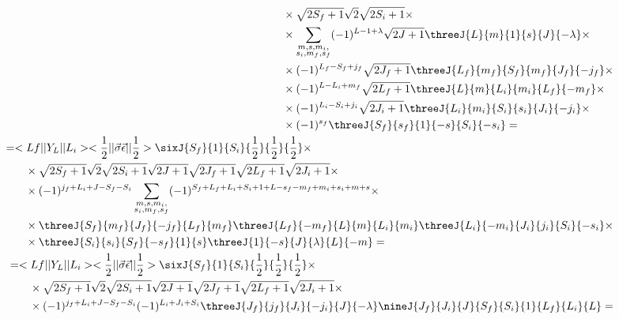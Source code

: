 \begin{align}
\begin{split}
        &\qquad\times \sqrt{2S_f+1} \sqrt{2} \sqrt{2S_i + 1} \times \\
        &\qquad\times \sum_{\substack{m, s, m_i,\\ s_i, m_f, s_f}} (-1)^{L-1+\lambda} \sqrt{2J+1} \threeJ{L}{m}{1}{s}{J}{-\lambda} \times \\
        &\qquad\times (-1)^{L_f - S_f + j_f} \sqrt{2J_f+1} \threeJ{L_f}{m_f}{S_f}{m_f}{J_f}{-j_f} \times \\
        &\qquad\times (-1)^{L-L_i+m_f} \sqrt{2L_f+1} \threeJ{L}{m}{L_i}{m_i}{L_f}{-m_f} \times \\
        &\qquad\times (-1)^{L_i - S_i + j_i} \sqrt{2J_i+1} \threeJ{L_i}{m_i}{S_i}{s_i}{J_i}{-j_i} \times \\
        &\qquad\times (-1)^{s_f} \threeJ{S_f}{s_f}{1}{-s}{S_i}{-s_i} =
    \end{split}\\
    \begin{split}
        &= <Lf|| Y_L ||L_i> <\frac{1}{2}|| \vec{\sigma}\vec{\epsilon} ||\frac{1}{2}> \sixJ{S_f}{1}{S_i}{\frac{1}{2}}{\frac{1}{2}}{\frac{1}{2}} \times \\
        &\qquad\times \sqrt{2S_f+1} \sqrt{2} \sqrt{2S_i + 1} \sqrt{2J+1} \sqrt{2J_f+1} \sqrt{2L_f+1} \sqrt{2J_i+1} \times \\
        &\qquad\times (-1)^{j_f+L_i+J-S_f-S_i} \sum_{\substack{m, s, m_i,\\ s_i, m_f, s_f}} (-1)^{S_f+L_f+L_i+S_i+1+L-s_f-m_f+m_i+s_i+m+s} \times \\
        &\qquad\times \threeJ{S_f}{m_f}{J_f}{-j_f}{L_f}{m_f} \threeJ{L_f}{-m_f}{L}{m}{L_i}{m_i} \threeJ{L_i}{-m_i}{J_i}{j_i}{S_i}{-s_i} \times \\
        &\qquad\times \threeJ{S_i}{s_i}{S_f}{-s_f}{1}{s} \threeJ{1}{-s}{J}{\lambda}{L}{-m} =
    \end{split}\\
    \begin{split}
        &= <Lf|| Y_L ||L_i> <\frac{1}{2}|| \vec{\sigma}\vec{\epsilon} ||\frac{1}{2}> \sixJ{S_f}{1}{S_i}{\frac{1}{2}}{\frac{1}{2}}{\frac{1}{2}} \times \\
        &\qquad\times \sqrt{2S_f+1} \sqrt{2} \sqrt{2S_i + 1} \sqrt{2J+1} \sqrt{2J_f+1} \sqrt{2L_f+1} \sqrt{2J_i+1} \times \\
        &\qquad\times (-1)^{j_f+L_i+J-S_f-S_i} (-1)^{L_i+J_i+S_i} \threeJ{J_f}{j_f}{J_i}{-j_i}{J}{-\lambda} \nineJ{J_f}{J_i}{J}{S_f}{S_i}{1}{L_f}{L_i}{L} =
    \end{split}\\

\end{align}
